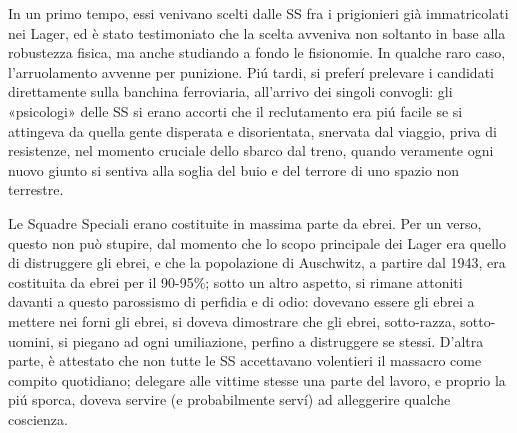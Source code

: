 \documentclass[a4paper, twoside, titlepage]{book}
\begin{document}
{In un primo tempo, essi venivano scelti dalle SS fra i prigionieri già immatricolati nei Lager, ed è stato testimoniato che la scelta avveniva non soltanto in base alla robustezza fisica, ma anche studiando a fondo le fisionomie. In qualche raro caso, l’arruolamento avvenne per punizione. Piú tardi, si preferí prelevare i candidati direttamente sulla banchina ferroviaria, all’arrivo dei singoli convogli: gli «psicologi» delle SS si erano accorti che il reclutamento era piú facile se si attingeva da quella gente disperata e disorientata, snervata dal viaggio, priva di resistenze, nel momento cruciale dello sbarco dal treno, quando veramente ogni nuovo giunto si sentiva alla soglia del buio e del terrore di uno spazio non terrestre.

Le Squadre Speciali erano costituite in massima parte da ebrei. Per un verso, questo non può stupire, dal momento che lo scopo principale dei Lager era quello di distruggere gli ebrei, e che la popolazione di Auschwitz, a partire dal 1943, era costituita da ebrei per il 90-95\%; sotto un altro aspetto, si rimane attoniti davanti a questo parossismo di perfidia e di odio: dovevano essere gli ebrei a mettere nei forni gli ebrei, si doveva dimostrare che gli ebrei, sotto-razza, sotto-uomini, si piegano ad ogni umiliazione, perfino a distruggere se stessi. D’altra parte, è attestato che non tutte le SS accettavano volentieri il massacro come compito quotidiano; delegare alle vittime stesse una parte del lavoro, e proprio la piú sporca, doveva servire (e probabilmente serví) ad alleggerire qualche coscienza.}
\end{document}
